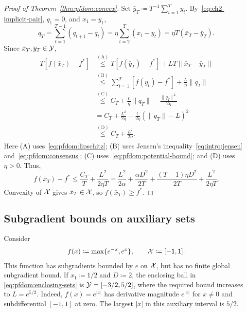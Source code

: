 \begin{proof}[Proof of Theorem~\ref{thm:pfdom:convex}]
Set $\bar y_T\coloneqq T^{-1}\sum_{t=1}^T y_t$.
By~\eqref{eq:ch2-implicit-pair}, $q_1=0$, and $x_1=y_1$,
\begin{equation}\label{eq:pfdom:consensus}
 q_T=\sum_{t=1}^{T-1}(q_{t+1}-q_t)
 =\eta\sum_{t=2}^T(x_t-y_t)
 =\eta T(\bar x_T-\bar y_T).
\end{equation}
Since $\bar x_T,\bar y_T\in\mathcal{Y}$,
\begin{equation}\label{eq:pfdom:convex-transfer}
\begin{aligned}
 T[f(\bar x_T)-f^*]
 &\overset{\mathrm{(A)}}{\le}T[f(\bar y_T)-f^*]
   +LT\|\bar x_T-\bar y_T\|\\
 &\overset{\mathrm{(B)}}{\le}\sum_{t=1}^T[f(y_t)-f^*]
   +\frac L\eta\|q_T\|\\
 &\overset{\mathrm{(C)}}{\le}C_T
   +\frac L\eta\|q_T\|-\frac{\|q_T\|^2}{2\eta}\\
 &=C_T+\frac{L^2}{2\eta}
   -\frac1{2\eta}(\|q_T\|-L)^2\\
 &\overset{\mathrm{(D)}}{\le}C_T+\frac{L^2}{2\eta}.
\end{aligned}
\end{equation}
Here (A) uses~\eqref{eq:pfdom:lipschitz}; (B) uses
Jensen's inequality~\eqref{eq:intro:jensen} and~\eqref{eq:pfdom:consensus};
(C) uses~\eqref{eq:pfdom:potential-bound}; and (D) uses $\eta>0$.
Thus,
\[
 f(\bar x_T)-f^*
 \le\frac{C_T}{T}+\frac{L^2}{2\eta T}
 =\frac{L^2}{2\alpha}+\frac{\alpha D^2}{2T}
   +\frac{(T-1)\eta D^2}{2T}+\frac{L^2}{2\eta T}.
\]
Convexity of $\mathcal{X}$ gives $\bar x_T\in\mathcal{X}$, so $f(\bar x_T)\ge f^*$.
\end{proof}


\subsection{Subgradient bounds on auxiliary sets}
\label{sec:pfdom:auxiliary-example}

Consider
\[
 f(x)\coloneqq\max\{e^{-x},e^x\},\qquad \mathcal{X}\coloneqq[-1,1].
\]
This function has subgradients bounded by $e$ on $\mathcal{X}$, but has no finite
global subgradient bound. If $x_1\coloneqq1/2$ and $D\coloneqq2$, the enclosing ball in
\eqref{eq:pfdom:enclosing-sets} is $\mathcal{Y}=[-3/2,5/2]$, where the required
bound increases to $L=e^{5/2}$. Indeed, $f(x)=e^{|x|}$ has derivative
magnitude $e^{|x|}$ for $x\ne0$ and subdifferential $[-1,1]$ at zero.
The largest $|x|$ in this auxiliary interval is $5/2$.

